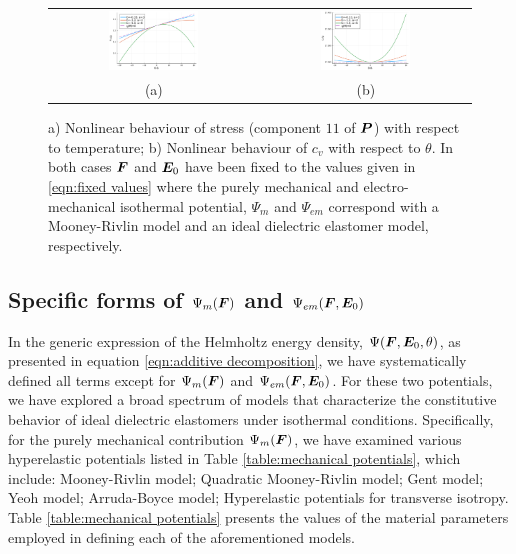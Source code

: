 \begin{figure}[htpb!]	
	\centering
	\begin{tabular}{cc}
		\includegraphics[width=0.45\textwidth]{Figures/NonlinearBehaviourTemperature}&
		\includegraphics[width=0.45\textwidth]{Figures/Cv_vs_Temperature}\\
		(a)  &  (b)
	\end{tabular}
	\vspace{-2mm}
	\caption{a) Nonlinear behaviour of stress (component $11$ of $\boldsymbol{P}$) with respect to temperature; b) Nonlinear behaviour of $c_v$ with respect to $\theta$. In both cases  $\boldsymbol{F}$ and $\boldsymbol{E}_0$ have been fixed to the values given in \eqref{eqn:fixed values} where the purely mechanical and electro-mechanical isothermal potential,  $\Psi_m$ and $\Psi_{em}$ correspond with a Mooney-Rivlin model and  an ideal dielectric elastomer model, respectively.}
	\label{fig:model}
\end{figure}


\subsection{Specific forms of $\Psi_m(\boldsymbol{F})$ and $\Psi_{em}(\boldsymbol{F},\boldsymbol{E}_0)$}\label{sec:ground truth models}

In the generic expression of the Helmholtz energy density, $\Psi(\boldsymbol{F},\boldsymbol{E}_0,\theta)$, as presented in equation \eqref{eqn:additive decomposition}, we have systematically defined all terms except for $\Psi_{m}(\boldsymbol{F})$ and $\Psi_{em}(\boldsymbol{F},\boldsymbol{E}_0)$. For these two potentials, we have explored a broad spectrum of models that characterize the constitutive behavior of ideal dielectric elastomers under isothermal conditions. Specifically, for the purely mechanical contribution $\Psi_m(\boldsymbol{F})$, we have examined various hyperelastic potentials listed in Table \ref{table:mechanical potentials}, which include: 
 Mooney-Rivlin model; Quadratic Mooney-Rivlin model; Gent model;  Yeoh model; Arruda-Boyce model; Hyperelastic potentials for transverse isotropy. Table \ref{table:mechanical potentials}  presents the values of the material parameters employed in defining each of the aforementioned models. 

